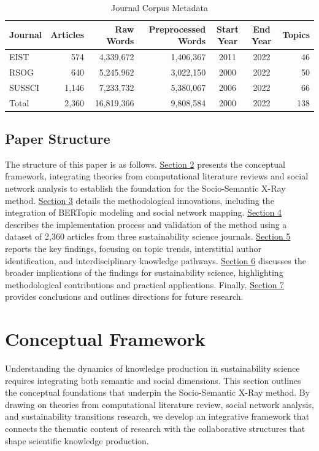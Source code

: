 \documentclass[12pt]{article}
\begin{document}
\begin{table}[ht]
\caption{Journal Corpus Metadata}
\label{tab:journal_metadata}
\begin{tabular}{lrrrccr}
\hline
\textbf{Journal} & \textbf{Articles} & \textbf{Raw Words} & \textbf{Preprocessed Words} & \textbf{Start Year} & \textbf{End Year} & \textbf{Topics} \\
\hline
EIST & 574 & 4,339,672 & 1,406,367 & 2011 & 2022 & 46 \\
RSOG & 640 & 5,245,962 & 3,022,150 & 2000 & 2022 & 50 \\
SUSSCI & 1,146 & 7,233,732 & 5,380,067 & 2006 & 2022 & 66 \\
\hline
Total & 2,360 & 16,819,366 & 9,808,584 & 2000 & 2022 & 138 \\
\hline
\end{tabular}
\end{table}

\subsection{Paper Structure}
The structure of this paper is as follows. \hyperref[sec:conceptual_framework]{Section 2} presents the conceptual framework, integrating theories from computational literature reviews and social network analysis to establish the foundation for the Socio-Semantic X-Ray method. \hyperref[sec:methodology]{Section 3} details the methodological innovations, including the integration of BERTopic modeling and social network mapping. \hyperref[sec:implementation]{Section 4} describes the implementation process and validation of the method using a dataset of 2,360 articles from three sustainability science journals. \hyperref[sec:results]{Section 5} reports the key findings, focusing on topic trends, interstitial author identification, and interdisciplinary knowledge pathways. \hyperref[sec:discussion]{Section 6} discusses the broader implications of the findings for sustainability science, highlighting methodological contributions and practical applications. Finally, \hyperref[sec:conclusion]{Section 7} provides conclusions and outlines directions for future research.

\section{Conceptual Framework}
\label{sec:conceptual_framework}

Understanding the dynamics of knowledge production in sustainability science requires integrating both semantic and social dimensions. This section outlines the conceptual foundations that underpin the Socio-Semantic X-Ray method. By drawing on theories from computational literature review, social network analysis, and sustainability transitions research, we develop an integrative framework that connects the thematic content of research with the collaborative structures that shape scientific knowledge production.
\end{document}
